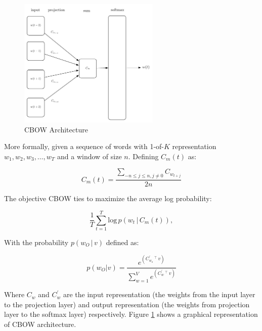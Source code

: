 \begin{figure}[hptb!]
    \centering
    \includegraphics[width=0.6\textwidth]{images/word2vec-cbow-latex.pdf} 
    \caption{CBOW Architecture}
    \label{fig:cbow-architecture-alone}
\end{figure}

More formally, given a sequence of words with 1-of-$K$ representation $w_1,w_2,w_3, \dots, w_T$ and a window
of size $n$. Defining $C_m(t)$ as:

\begin{equation}
\label{eq:cbow-mean}
   C_{m}(t) =    \frac{\sum_{-n \leq j \leq n, j \neq 0} { 
       C_{w_{t+j}}} } {2n}    
\end{equation}

The  objective  \ac{CBOW}  ties to maximize the average log probability:


\begin{equation}
  \label{eq:logprob-cbow}
   \frac{1}{T} \sum^{T}_{t=1} \text{log} \, p
     \left( w_t \, |\, C_{m}(t) \right),
\end{equation}



With the probability  $p\left( w_O \, |\, v \right)$  defined as:

\begin{equation}
  \label{eq:logp-cbow}
  p(w_O|v) = \frac{e^{\left(C^{'}_{w_o}\,^\top\,v \right)}
  }{\sum^{V}_{w=1} e^{ \left( C^{'}_w \,^\top\, v \right)  } }  
\end{equation}


Where $C_w$ and $C^{'}_w$ are the input representation (the weights from the input layer to the
projection layer) and output representation (the weights from
projection layer to the softmax layer) respectively.   Figure
\ref{fig:cbow-architecture-alone} shows a graphical representation of
\ac{CBOW} architecture.

